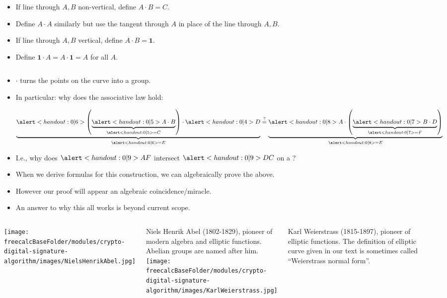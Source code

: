 \begin{frame}[fragile]
\begin{columns}
	\begin{definition}
		\begin{itemize}
			\item If line through $A,B$ non-vertical, define $A\cdot B = C$.
			\item Define $A\cdot A$ similarly but use the tangent through $A$ in place of the line through $A, B$.
			\item If line through $A,B$ vertical, define $A\cdot B = \mathbf 1$.
			\item Define $\mathbf 1\cdot A = A\cdot \mathbf 1 = A$ for all $ A$.
		\end{itemize}
	\end{definition}
\end{columns}
\begin{itemize}
\item<2-> $\cdot$ turns the points on the curve into a group.
\item<3-> In particular: why does the associative law hold:

\hfil \hfil $ \underbrace{ \alertNoH{6}{ \left( \underbrace{ \alertNoH{5}{A\cdot B}}_{\alertNoH{5}{=C} } \right) \cdot\alertNoH{4}{ D}} }_{\alertNoH{6}{ =E}} \stackrel{?}{=}  \underbrace{\alertNoH{8}{ A\cdot \left( \underbrace{ \alertNoH{7}{B\cdot D}}_{\alertNoH{7}{=F}}\right) } }_{\alertNoH{8}{=E}}$
\item<9-> I.e., why does  $\alertNoH{9}{AF}$ intersect $\alertNoH{9}{DC}$ on a ?
\item<10-> When we derive formulas for this construction, we can algebraically prove the above.
\item<11-> However our proof will appear an algebraic coincidence/miracle.
\item<12-> An answer to why this all works is beyond current scope.
\end{itemize}



\vskip 10cm

\end{frame}

\begin{frame}
\begin{columns}[T]
\texttt{[image: \\freecalcBaseFolder/modules/crypto-digital-signature-algorithm/images/NielsHenrikAbel.jpg]}

Niels Henrik Abel (1802-1829), pioneer of modern algebra and elliptic functions. Abelian groups are named after him.
\texttt{[image: \\freecalcBaseFolder/modules/crypto-digital-signature-algorithm/images/KarlWeierstrass.jpg]}

Karl Weierstrass (1815-1897), pioneer of elliptic functions. The definition of elliptic curve given in our text is sometimes called ``Weierstrass normal form''.

\end{columns}
\end{frame}
